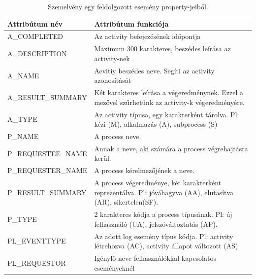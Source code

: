 \begin{table}[!htbp] 
	\centering
	\caption{Szemelvény egy feldolgozott esemény property-jeiből.}
	\begin{tabular}{lp{10cm}}
		Attribútum név & Attribútum funkciója \\
		\toprule
		A\_COMPLETED & Az activity befejezésének időpontja \\
		A\_DESCRIPTION & Maximum 300 karakteres, beszédes leírása az activity-nek \\
		A\_NAME & Acvitiy beszédes neve. Segíti az activity azonosítását \\
		A\_RESULT\_SUMMARY & Két karakteres leírása a végeredménynek. Ezzel a mezővel szűrhetünk az activity-k végeredményére. \\
		A\_TYPE & Az activity típusa, egy karakterként tárolva. Pl: kézi (M), alkalmazás (A), subprocess (S) \\
		P\_NAME & A process neve. \\
		P\_REQUESTEE\_NAME & Annak a neve, aki számára a process végrehajtásra kerül. \\
		P\_REQUESTER\_NAME & A process kérelmezőjének a neve. \\
		P\_RESULT\_SUMMARY & A process végeredménye, két karakterként reprezentálva. Pl: jóváhagyva (AA), elutasítva (AR), sikertelen(SF). \\
		P\_TYPE & 2 karakteres kódja a process típusának. Pl: új felhasználó (UA), jelszóváltoztatás (AP). \\
		PL\_EVENTTYPE & Az adott log esemény típus kódja. Pl: activity létrehozva (AC), activity állapot változott (AS)\\
		
		PL\_REQUESTOR & Igénylő neve felhasználókkal kapcsolatos eseményeknél \\
	\end{tabular}%
\label{tab:properties}
\end{table}%

